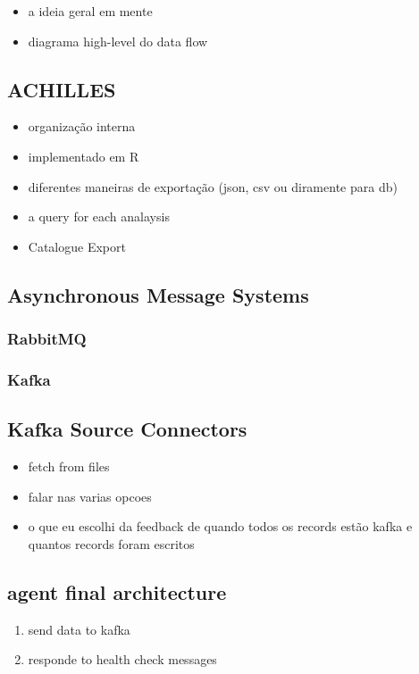 \begin{itemize}
    \item a ideia geral em mente
    \item diagrama high-level do data flow
\end{itemize}

\subsection{ACHILLES}
\begin{itemize}
    \item organização interna
    \item implementado em R
    \item diferentes maneiras de exportação (json, csv ou diramente para db)
    \item a query for each analaysis
    \item Catalogue Export
\end{itemize}

\subsection{Asynchronous Message Systems}

\subsubsection{RabbitMQ}

\subsubsection{Kafka}


\subsection{Kafka Source Connectors}
\begin{itemize}
    \item fetch from files
    \item falar nas varias opcoes
    \item o que eu escolhi da feedback de quando todos os records estão kafka e quantos records foram escritos
\end{itemize}


\subsection{agent final architecture}
\begin{enumerate}
    \item send data to kafka
    \item responde to health check messages
\end{enumerate}

